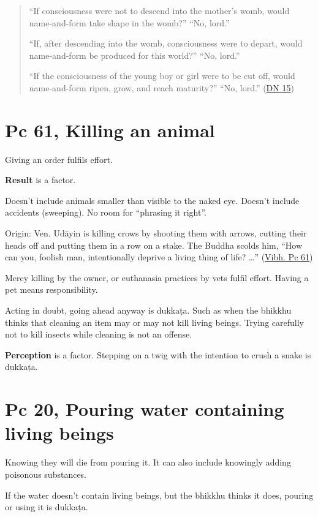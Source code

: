 \begin{quote}
``If consciousness were not to descend into the mother's womb, would
name-and-form take shape in the womb?'' ``No, lord.''

``If, after descending into the womb, consciousness were to depart,
would name-and-form be produced for this world?'' ``No, lord.''

``If the consciousness of the young boy or girl were to be cut off,
would name-and-form ripen, grow, and reach maturity?'' ``No, lord.''
(\href{https://www.accesstoinsight.org/tipitaka/dn/dn.15.0.than.html}{DN
15})
\end{quote}

\section{Pc 61, Killing an animal}

Giving an order fulfils effort.

\textbf{Result} is a factor.

Doesn't include animals smaller than visible to the naked eye. Doesn't
include accidents (sweeping). No room for ``phrasing it right''.

Origin: Ven. Udāyin is killing crows by shooting them with arrows,
cutting their heads off and putting them in a row on a stake. The Buddha
scolds him, ``How can you, foolish man, intentionally deprive a living
thing of life? \ldots{}''
(\href{https://suttacentral.net/pli-tv-bu-vb-pc61/en/horner}{Vibh. Pc
61})

Mercy killing by the owner, or euthanasia practices by vets fulfil
effort. Having a pet means responsibility.

Acting in doubt, going ahead anyway is dukkaṭa. Such as when the bhikkhu
thinks that cleaning an item may or may not kill living beings. Trying
carefully not to kill insects while cleaning is not an offense.

\textbf{Perception} is a factor. Stepping on a twig with the intention
to crush a snake is dukkaṭa.

\section{Pc 20, Pouring water containing living beings}

Knowing they will die from pouring it. It can also include knowingly
adding poisonous substances.

If the water doesn't contain living beings, but the bhikkhu thinks it
does, pouring or using it is dukkaṭa.

